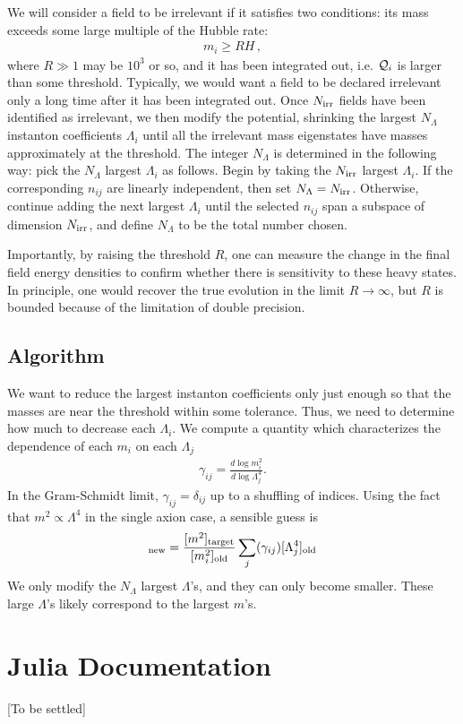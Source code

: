 \documentclass[11pt]{article}
\begin{document}
We will consider a field to be irrelevant if it satisfies two conditions: its mass exceeds some large multiple of the Hubble rate:
\begin{align}
    m_i \geq R H\,,
\end{align}
where $R\gg1$ may be $10^3$ or so, and it has been integrated out, i.e. ${\cal Q}_i$ is larger than some threshold. Typically, we would want a field to be declared irrelevant only a long time after it has been integrated out. Once $N_{\rm irr}$ fields have been identified as irrelevant, we then modify the potential, shrinking the largest $N_\Lambda$ instanton coefficients $\Lambda_i$ until all the irrelevant mass eigenstates have masses approximately at the threshold. The integer $N_\Lambda$ is determined in the following way: pick the $N_{\Lambda}$ largest $\Lambda_i$ as follows. Begin by taking the $N_{\rm irr}$ largest $\Lambda_i$. If the corresponding $n_{ij}$ are linearly independent, then set $N_{\Lambda} = N_{\rm irr}$. Otherwise, continue adding the next largest $\Lambda_i$ until the selected $n_{ij}$ span a subspace of dimension $N_{\rm irr}$, and define $N_{\Lambda}$ to be the total number chosen.  


Importantly, by raising the threshold $R$, one can measure the change in the final field energy densities to confirm whether there is sensitivity to these heavy states. In principle, one would recover the true evolution in the limit $R\to\infty$, but $R$ is bounded because of the limitation of double precision.

\subsection{Algorithm}
We want to reduce the largest instanton coefficients only just enough so that the masses are near the threshold within some tolerance. Thus, we need to determine how much to decrease each $\Lambda_i$. We compute a quantity which characterizes the dependence of each $m_i$ on each $\Lambda_j$
\begin{align}
	\gamma_{ij} = \frac{d\log m_i^2}{d\log\Lambda_j^4}.
\end{align}
In the Gram-Schmidt limit, $\gamma_{ij} = \delta_{ij}$ up to a shuffling of indices. Using the fact that $m^2\propto\Lambda^4$ in the single axion case, a sensible guess is
\begin{align}
	[\Lambda_i^4]_{\rm new} =  \frac{[m^2]_{\rm target}}{[m_i^2]_{\rm old}}\sum_j(\gamma_{ij})[\Lambda_j^4]_{\rm old}
\end{align}
We only modify the $N_\Lambda$ largest $\Lambda$'s, and they can only become smaller. These large $\Lambda$'s likely correspond to the largest $m$'s.

\section{Julia Documentation}\label{sec:documentation}
[To be settled]


\end{document}
